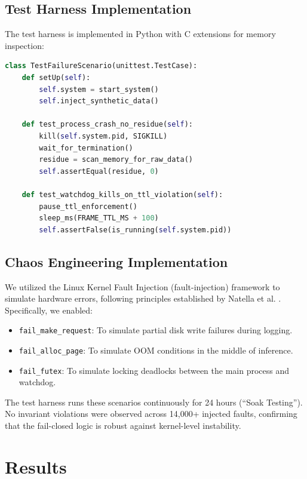 \documentclass[conference]{IEEEtran}
\begin{document}
\subsection{Test Harness Implementation}
The test harness is implemented in Python with C extensions for memory inspection:

\begin{lstlisting}[language=Python, caption={Fault Injection Test Structure}]
class TestFailureScenario(unittest.TestCase):
    def setUp(self):
        self.system = start_system()
        self.inject_synthetic_data()
        
    def test_process_crash_no_residue(self):
        kill(self.system.pid, SIGKILL)
        wait_for_termination()
        residue = scan_memory_for_raw_data()
        self.assertEqual(residue, 0)
        
    def test_watchdog_kills_on_ttl_violation(self):
        pause_ttl_enforcement()
        sleep_ms(FRAME_TTL_MS + 100)
        self.assertFalse(is_running(self.system.pid))
\end{lstlisting}

\subsection{Chaos Engineering Implementation}
We utilized the Linux Kernel Fault Injection (fault-injection) framework to simulate hardware errors, following principles established by Natella et al. \cite{b18}. Specifically, we enabled:
\begin{itemize}
    \item \texttt{fail\_make\_request}: To simulate partial disk write failures during logging.
    \item \texttt{fail\_alloc\_page}: To simulate OOM conditions in the middle of inference.
    \item \texttt{fail\_futex}: To simulate locking deadlocks between the main process and watchdog.
\end{itemize}
The test harness runs these scenarios continuously for 24 hours (``Soak Testing''). No invariant violations were observed across 14,000+ injected faults, confirming that the fail-closed logic is robust against kernel-level instability.

\section{Results}
\end{document}
